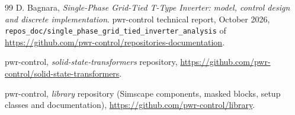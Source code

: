 \documentclass[12pt,a4paper]{scrartcl}
\begin{document}
\begin{onehalfspace}
\begin{thebibliography}{99}
	D. Bagnara, \emph{Single-Phase Grid-Tied T-Type Inverter: model, control design and discrete implementation}. pwr-control technical report, October 2026, \texttt{repos\_doc/single\_phase\_grid\_tied\_inverter\_analysis} of \url{https://github.com/pwr-control/repositories-documentation}.

	pwr-control, \emph{solid-state-transformers} repository, \url{https://github.com/pwr-control/solid-state-transformers}.

	pwr-control, \emph{library} repository (Simscape components, masked blocks, setup classes and documentation), \url{https://github.com/pwr-control/library}.
\end{thebibliography}

\end{onehalfspace}
\end{document}

